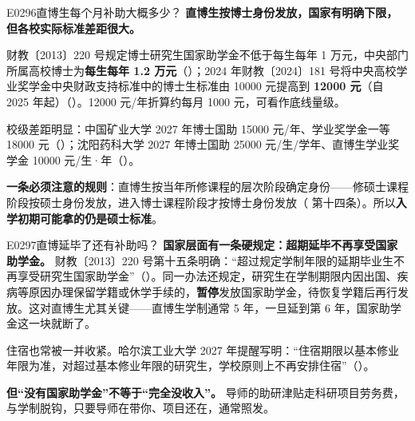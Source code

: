 \begin{qa}{E0296}{直博生每个月补助大概多少？}
\textbf{直博生按博士身份发放，国家有明确下限，但各校实际标准差距很大。}

财教〔2013〕220 号规定博士研究生国家助学金不低于每生每年 1 万元，中央部门所属高校博士为\textbf{每生每年 1.2 万元}（）；2024 年财教〔2024〕181 号将中央高校学业奖学金中央财政支持标准中的博士生标准由 10000 元提高到 \textbf{12000 元}（自 2025 年起）（）。12000 元/年折算约每月 1000 元，可看作底线量级。

校级差距明显：中国矿业大学 2027 年博士国助 15000 元/年、学业奖学金一等 18000 元（）；沈阳药科大学 2027 年博士国助 25000 元/生/学年、直博生学业奖学金 10000 元/生·年（）。

\textbf{一条必须注意的规则}：直博生按当年所修课程的层次阶段确定身份——修硕士课程阶段按硕士身份发放，进入博士课程阶段才按博士身份发放（ 第十四条）。所以\textbf{入学初期可能拿的仍是硕士标准}。
\end{qa}

\begin{qa}{E0297}{直博延毕了还有补助吗？}
\textbf{国家层面有一条硬规定：超期延毕不再享受国家助学金。} 财教〔2013〕220 号第十五条明确：“超过规定学制年限的延期毕业生不再享受研究生国家助学金”（）。同一办法还规定，研究生在学制期限内因出国、疾病等原因办理保留学籍或休学手续的，\textbf{暂停}发放国家助学金，待恢复学籍后再行发放。这对直博生尤其关键——直博生学制通常 5 年，一旦延到第 6 年，国家助学金这一块就断了。

住宿也常被一并收紧。哈尔滨工业大学 2027 年提醒写明：“住宿期限以基本修业年限为准，对超过基本修业年限的研究生，学校原则上不再安排住宿”（）。

\textbf{但“没有国家助学金”不等于“完全没收入”。} 导师的助研津贴走科研项目劳务费，与学制脱钩，只要导师在带你、项目还在，通常照发。
\end{qa}

